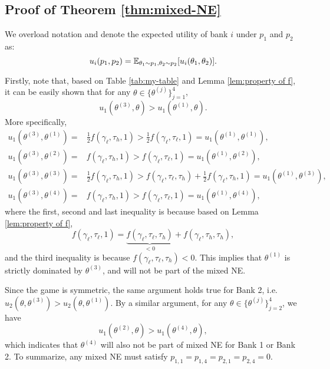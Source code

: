\subsection{Proof of Theorem \ref{thm:mixed-NE}}
\label{Proof:Theorem:mixedNE}
We overload notation and denote the expected utility of bank $i$ under $p_1$ and $p_2$ as:
$$ u_{i}(p_1,p_2)=\mathbb{E}_{\theta_1\sim p_1, \theta_2\sim p_2}[u_i(\theta_1,\theta_2)]. $$


\noindent Firstly, note that, based on Table \ref{tab:my-table} and Lemma \ref{lem:property of f}, it can be easily shown that for any $\theta\in\{\theta^{(j)}\}_{j=1}^4$, 
$$u_1(\theta^{(3)},\theta)> u_1(\theta^{(1)},\theta). $$
More specifically, 
\begin{equation*}
    \begin{split}
u_1(\theta^{(3)},\theta^{(1)})={} & \frac{1}{2}f(\gamma_{\ell},\tau_{h},1)>\frac{1}{2}f(\gamma_{\ell},\tau_{\ell},1) =   u_1(\theta^{(1)},\theta^{(1)}),\\
u_1(\theta^{(3)},\theta^{(2)})={} & f(\gamma_{\ell},\tau_{h},1)>f(\gamma_{\ell},\tau_{\ell},1) =   u_1(\theta^{(1)},\theta^{(2)}),\\
u_1(\theta^{(3)},\theta^{(3)})={} & \frac{1}{2}f(\gamma_{\ell},\tau_{h},1)>f(\gamma_{\ell},\tau_{\ell},\tau_h)+\frac{1}{2}f(\gamma_{\ell},\tau_h,1) =   u_1(\theta^{(1)},\theta^{(3)}),\\
u_1(\theta^{(3)},\theta^{(4)})={} & f(\gamma_{\ell},\tau_{h},1)>f(\gamma_{\ell},\tau_{\ell},1) =   u_1(\theta^{(1)},\theta^{(4)}),
    \end{split}
\end{equation*}
where the first, second and last inequality is because based on Lemma \ref{lem:property of f}, 
$$f(\gamma_{\ell},\tau_{\ell},1)=\underbrace{f(\gamma_{\ell},\tau_{\ell},\tau_{h})}_{<0}+f(\gamma_{\ell},\tau_{h},\tau_{h}),$$
and the third inequality is because $f(\gamma_{\ell},\tau_{\ell},\tau_{h})<0.$ This implies that $\theta^{(1)}$ is strictly dominated by $\theta^{(3)}$, and will not be part of the mixed NE. 


Since the game is symmetric, the same argument holds true for Bank 2, i.e. $u_2(\theta,\theta^{(3)}) > u_2(\theta,\theta^{(1)})$. By a similar argument, for any $\theta\in\{\theta^{(j)}\}_{j=2}^4$, we have
$$u_1(\theta^{(2)},\theta)> u_1(\theta^{(4)},\theta), $$
which indicates that $\theta^{(4)}$ will also not be part of mixed NE for Bank 1 or Bank 2.  To summarize, any mixed NE must satisfy $p_{1,1}=p_{1,4}=p_{2,1}=p_{2,4}=0$.\\


